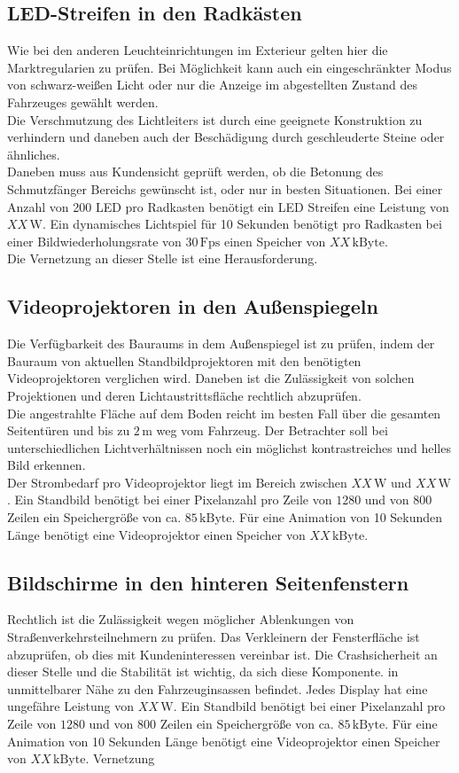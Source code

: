 \subsection{LED-Streifen in den Radkästen}
Wie bei den anderen Leuchteinrichtungen im Exterieur gelten hier die Marktregularien zu prüfen. Bei Möglichkeit kann auch ein eingeschränkter Modus von schwarz-weißen Licht oder nur die Anzeige im abgestellten Zustand des Fahrzeuges gewählt werden. \\
Die Verschmutzung des Lichtleiters ist durch eine geeignete Konstruktion zu verhindern und daneben auch der Beschädigung durch geschleuderte Steine oder ähnliches. \\
Daneben muss aus Kundensicht geprüft werden, ob die Betonung des Schmutzfänger Bereichs gewünscht ist, oder nur in besten Situationen.
Bei einer Anzahl von 200 LED pro Radkasten benötigt ein LED Streifen eine Leistung von $ XX\,\mathrm{W} $.
Ein dynamisches Lichtspiel für 10 Sekunden benötigt pro Radkasten bei einer Bildwiederholungsrate von $ 30\,\mathrm{Fps} $ einen Speicher von $ XX\,\mathrm{kByte}$. \\
Die Vernetzung an dieser Stelle ist eine Herausforderung.
\subsection{Videoprojektoren in den Außenspiegeln}
Die Verfügbarkeit des Bauraums in dem Außenspiegel ist zu prüfen, indem der Bauraum von aktuellen Standbildprojektoren mit den benötigten Videoprojektoren verglichen wird. 
Daneben ist die Zulässigkeit von solchen Projektionen und deren Lichtaustrittsfläche rechtlich abzuprüfen. \\
Die angestrahlte Fläche auf dem Boden reicht im besten Fall über die gesamten Seitentüren und bis zu $ 2\,\mathrm{m} $ weg vom Fahrzeug.
Der Betrachter soll bei unterschiedlichen Lichtverhältnissen noch ein möglichst kontrastreiches und helles Bild erkennen. \\
Der Strombedarf pro Videoprojektor liegt im Bereich zwischen $ XX\,\mathrm{W} $ und $ XX\,\mathrm{W} $.
Ein Standbild benötigt bei einer Pixelanzahl pro Zeile von $ 1280 $ und von $ 800 $ Zeilen ein Speichergröße von ca. $ 85\,\mathrm{kByte}$. Für eine Animation von 10 Sekunden Länge benötigt eine Videoprojektor einen Speicher von $ XX\,\mathrm{kByte}$.
\subsection{Bildschirme in den hinteren Seitenfenstern}
Rechtlich ist die Zulässigkeit wegen möglicher Ablenkungen von Straßenverkehrsteilnehmern zu prüfen.
Das Verkleinern der Fensterfläche ist abzuprüfen, ob dies mit Kundeninteressen vereinbar ist.
Die Crashsicherheit an dieser Stelle und die Stabilität ist wichtig, da sich diese Komponente. in unmittelbarer Nähe zu den Fahrzeuginsassen befindet.
Jedes Display hat eine ungefähre Leistung von $ XX\,\mathrm{W} $. 
Ein Standbild benötigt bei einer Pixelanzahl pro Zeile von $ 1280 $ und von $ 800 $ Zeilen ein Speichergröße von ca. $ 85\,\mathrm{kByte}$. Für eine Animation von 10 Sekunden Länge benötigt eine Videoprojektor einen Speicher von $ XX\,\mathrm{kByte}$.
Vernetzung
